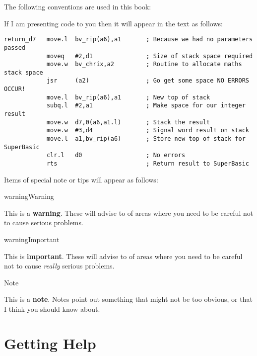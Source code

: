 The following conventions are used in this book:

If I am presenting code to you then it will appear in the text as
    follows:

\begin{lstlisting}[firstnumber=1,]
return_d7   move.l  bv_rip(a6),a1       ; Because we had no parameters passed
            moveq   #2,d1               ; Size of stack space required
            move.w  bv_chrix,a2         ; Routine to allocate maths stack space
            jsr     (a2)                ; Go get some space NO ERRORS OCCUR!
            move.l  bv_rip(a6),a1       ; New top of stack
            subq.l  #2,a1               ; Make space for our integer result
            move.w  d7,0(a6,a1.l)       ; Stack the result
            move.w  #3,d4               ; Signal word result on stack
            move.l  a1,bv_rip(a6)       ; Store new top of stack for SuperBasic
            clr.l   d0                  ; No errors
            rts                         ; Return result to SuperBasic
\end{lstlisting}

Items of special note or tips will appear as follows:
\begin{DBKadmonition}{warning}{Warning}

This is a \textbf{warning}. These will
      advise to of areas where you need to be careful not to cause serious
      problems.
\end{DBKadmonition}
\begin{DBKadmonition}{warning}{Important}

This is \textbf{important}. These will
      advise to of areas where you need to be careful not to cause
 \emph{really} serious problems.
\end{DBKadmonition}
\begin{DBKadmonition}{}{Note}

This is a \textbf{note}. Notes point out
      something that might not be too obvious, or that I think you should know
      about.
\end{DBKadmonition}

\section{Getting Help}
\label{preface-getting-help}%

